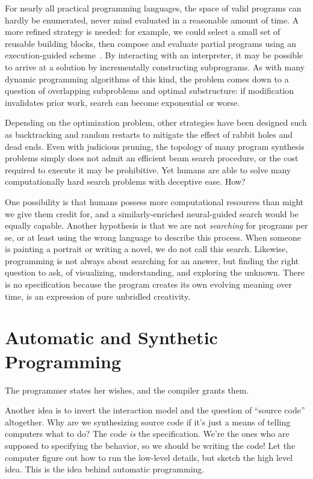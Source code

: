 \documentclass[10pt]{article}
\begin{document}
For nearly all practical programming languages, the space of valid programs can hardly be enumerated, never mind evaluated in a reasonable amount of time. A more refined strategy is needed: for example, we could select a small set of reusable building blocks, then compose and evaluate partial programs using an execution-guided scheme~\cite{chen2018execution, wang2018execution}. By interacting with an interpreter, it may be possible to arrive at a solution by incrementally constructing subprograms. As with many dynamic programming algorithms of this kind, the problem comes down to a question of overlapping subproblems and optimal substructure: if modification invalidates prior work, search can become exponential or worse.


Depending on the optimization problem, other strategies have been designed such as backtracking and random restarts to mitigate the effect of rabbit holes and dead ends. Even with judicious pruning, the topology of many program synthesis problems simply does not admit an efficient beam search procedure, or the cost required to execute it may be prohibitive. Yet humans are able to solve many computationally hard search problems with deceptive ease. How?

One possibility is that humans possess more computational resources than might we give them credit for, and a similarly-enriched neural-guided search would be equally capable. Another hypothesis is that we are not \textit{searching} for programs per se, or at least using the wrong language to describe this process. When someone is painting a portrait or writing a novel, we do not call this search. Likewise, programming is not always about searching for an answer, but finding the right question to ask, of visualizing, understanding, and exploring the unknown. There is no specification because the program creates its own evolving meaning over time, is an expression of pure unbridled creativity.

  \section{Automatic and Synthetic Programming}

The programmer states her wishes, and the compiler grants them.

Another idea is to invert the interaction model and the question of ``source code'' altogether. Why are we synthesizing source code if it's just a means of telling computers what to do? The code \textit{is} the specification. We're the ones who are supposed to specifying the behavior, so we should be writing the code! Let the computer figure out how to run the low-level details, but sketch the high level idea. This is the idea behind automatic programming.
\end{document}
